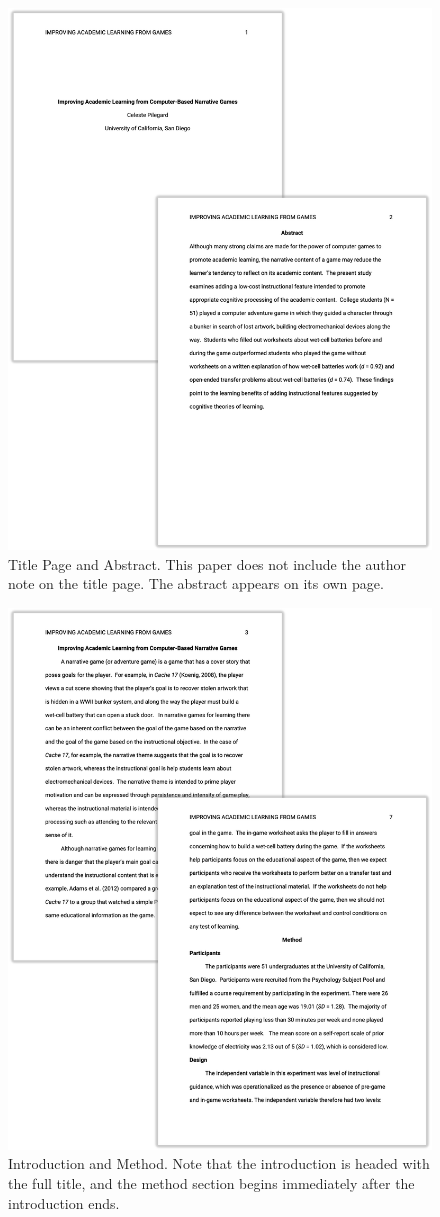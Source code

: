 \documentclass[
]{krantz}
\begin{document}
\begin{figure}

{\centering \includegraphics[width=0.65\linewidth]{images/ch11/sample1} 

}

\caption{Title Page and Abstract. This paper does not include the author note on the title page. The abstract appears on its own page.}\label{fig:sample1}
\end{figure}

\begin{figure}

{\centering \includegraphics[width=0.65\linewidth]{images/ch11/sample2} 

}

\caption{Introduction and Method. Note that the introduction is headed with the full title, and the method section begins immediately after the introduction ends.}\label{fig:sample2}
\end{figure}
\end{document}
